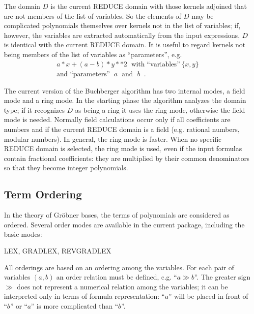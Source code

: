The domain $D$ is the current REDUCE domain with those kernels
adjoined that are not members of the list of variables. So the
elements of $D$ may be complicated polynomials themselves over
kernels not in the list of variables; if, however, the variables are
extracted automatically from the input expressions, $D$ is identical
with the current REDUCE domain. It is useful to regard kernels not
being members of the list of variables as ``parameters'', e.g.
\[
\begin{array}{c}
 a * x + (a - b) * y**2 \;\mbox{ with ``variables''}\ \{x,y\} \\
\mbox{and ``parameters''  $\;a\;$ and $\;b\;$}\;.
\end{array}
\]

The current version of the Buchberger algorithm has two internal
modes, a field mode and a ring mode. In the starting phase the
algorithm analyzes the domain type; if it recognizes $D$ as being a
ring it uses the ring mode, otherwise the field mode is needed.
Normally field calculations occur only if all coefficients are numbers
and if the current REDUCE domain is a field (e.g. rational numbers,
modular numbers). In general, the ring mode is faster. When no specific
REDUCE domain is selected, the ring mode is used, even if the input
formulas contain fractional coefficients: they are multiplied by their
common denominators so that they become integer polynomials.



\subsection{Term Ordering} \par
In the theory of Gr\"obner bases, the terms of polynomials are
considered as ordered. Several order modes are available in
the current package, including the basic modes:
 

\begin{center}
LEX, GRADLEX, REVGRADLEX
\end{center}

All orderings are based on an ordering among the variables. For
each pair of variables $(a,b)$ an order relation must be defined, e.g.
``$ a\gg b $''. The greater sign $\gg$  does not represent a numerical
relation among the variables; it can be interpreted only in terms of
formula representation: ``$a$'' will be placed in front of ``$b$'' or
``$a$''  is more complicated than ``$b$''.

